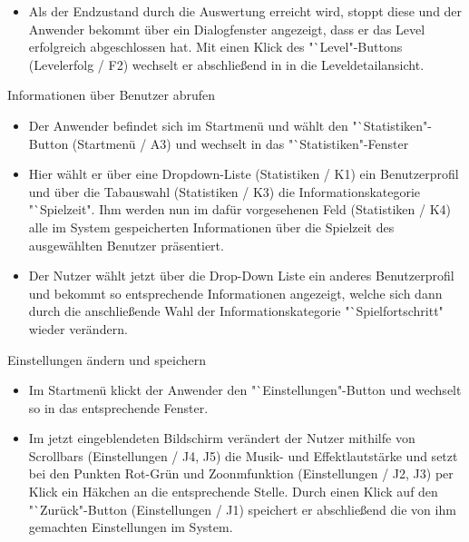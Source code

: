\begin{requirements}
\begin{itemize}
  			\item Als der Endzustand durch die Auswertung erreicht wird, stoppt diese und der Anwender bekommt über ein Dialogfenster angezeigt, dass er das Level erfolgreich abgeschlossen hat. Mit einen Klick des "`Level"-Buttons (Levelerfolg / F2) wechselt er abschließend in in die Leveldetailansicht.
  			
  			
  	\end{itemize}
  			

  	
  	 Informationen über Benutzer abrufen
  	
  	
  	\begin{itemize}
  	
		\item Der Anwender befindet sich im Startmenü und wählt den "`Statistiken"-Button (Startmenü / A3) und wechselt in das "`Statistiken"-Fenster
		
		\item Hier wählt er über eine Dropdown-Liste (Statistiken / K1) ein Benutzerprofil und über die Tabauswahl (Statistiken / K3) die Informationskategorie "`Spielzeit". Ihm werden nun im dafür vorgesehenen Feld (Statistiken / K4) alle im System gespeicherten Informationen über die Spielzeit des ausgewählten Benutzer präsentiert.
		
		\item Der Nutzer wählt jetzt über die Drop-Down Liste ein anderes Benutzerprofil und bekommt so entsprechende Informationen angezeigt, welche sich dann durch die anschließende Wahl der Informationskategorie "`Spielfortschritt" wieder verändern.
		
  	
  	\end{itemize}
  	
  	
  	
  	 Einstellungen ändern und speichern
  	
  	
  	\begin{itemize}
  	
		\item Im Startmenü klickt der Anwender den "`Einstellungen"-Button und wechselt so in das entsprechende Fenster.
		
		\item Im jetzt eingeblendeten Bildschirm verändert der Nutzer mithilfe von Scrollbars (Einstellungen / J4, J5) die Musik- und Effektlautstärke und setzt bei den Punkten Rot-Grün und Zoonmfunktion (Einstellungen / J2, J3) per Klick ein Häkchen an die entsprechende Stelle. Durch einen Klick auf den "`Zurück"-Button (Einstellungen / J1) speichert er abschließend die von ihm gemachten Einstellungen im System.
  	
  	\end{itemize}
  	
  	
\end{requirements}
  		
